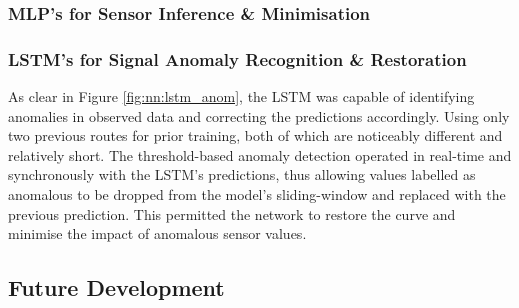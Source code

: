 \documentclass[a4paper, 10pt]{article}
\numberwithin{equation}{section}
\begin{document}
\subsubsection{MLP's for Sensor Inference \& Minimisation}


\subsubsection{LSTM's for Signal Anomaly Recognition \& Restoration}
 As clear in Figure \ref{fig:nn:lstm_anom}, the LSTM was capable of identifying anomalies in observed data and correcting the predictions accordingly. Using only two previous routes for prior training, both of which are noticeably different and relatively short. The threshold-based anomaly detection operated in real-time and synchronously with the LSTM's predictions, thus allowing values labelled as anomalous to be dropped from the model's sliding-window and replaced with the previous prediction. This permitted the network to restore the curve and minimise the impact of anomalous sensor values.

\subsection{Future Development}



\end{document}
